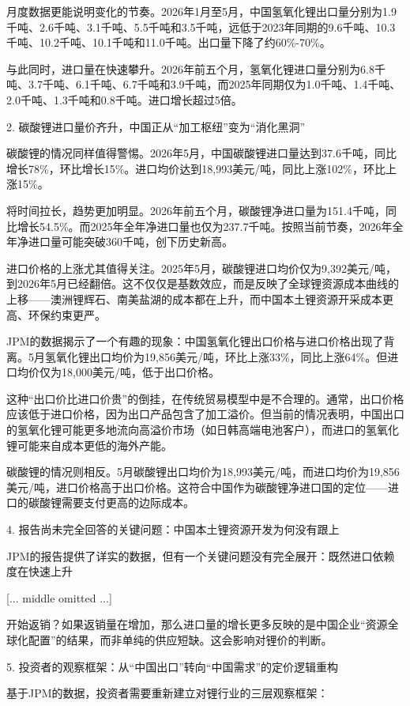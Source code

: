 \documentclass[11pt]{ctexart}
\begin{document}
月度数据更能说明变化的节奏。2026年1月至5月，中国氢氧化锂出口量分别为1.9千吨、2.6千吨、3.1千吨、5.5千吨和3.5千吨，远低于2023年同期的9.6千吨、10.3千吨、10.2千吨、10.1千吨和11.0千吨。出口量下降了约60\%-70\%。

与此同时，进口量在快速攀升。2026年前五个月，氢氧化锂进口量分别为6.8千吨、3.7千吨、6.1千吨、6.7千吨和3.9千吨，而2025年同期仅为1.0千吨、1.4千吨、2.0千吨、1.3千吨和0.8千吨。进口增长超过5倍。

2. 碳酸锂进口量价齐升，中国正从“加工枢纽”变为“消化黑洞”

碳酸锂的情况同样值得警惕。2026年5月，中国碳酸锂进口量达到37.6千吨，同比增长78\%，环比增长15\%。进口均价达到18,993美元/吨，同比上涨102\%，环比上涨15\%。

将时间拉长，趋势更加明显。2026年前五个月，碳酸锂净进口量为151.4千吨，同比增长54.5\%。而2025年全年净进口量也仅为237.7千吨。按照当前节奏，2026年全年净进口量可能突破360千吨，创下历史新高。

进口价格的上涨尤其值得关注。2025年5月，碳酸锂进口均价仅为9,392美元/吨，到2026年5月已经翻倍。这不仅仅是基数效应，而是反映了全球锂资源成本曲线的上移——澳洲锂辉石、南美盐湖的成本都在上升，而中国本土锂资源开采成本更高、环保约束更严。

JPM的数据揭示了一个有趣的现象：中国氢氧化锂出口价格与进口价格出现了背离。5月氢氧化锂出口均价为19,856美元/吨，环比上涨33\%，同比上涨64\%。但进口均价仅为18,000美元/吨，低于出口价格。

这种“出口价比进口价贵”的倒挂，在传统贸易模型中是不合理的。通常，出口价格应该低于进口价格，因为出口产品包含了加工溢价。但当前的情况表明，中国出口的氢氧化锂可能更多地流向高溢价市场（如日韩高端电池客户），而进口的氢氧化锂可能来自成本更低的海外产能。

碳酸锂的情况则相反。5月碳酸锂出口均价为18,993美元/吨，而进口均价为19,856美元/吨，进口价格高于出口价格。这符合中国作为碳酸锂净进口国的定位——进口的碳酸锂需要支付更高的边际成本。

4. 报告尚未完全回答的关键问题：中国本土锂资源开发为何没有跟上

JPM的报告提供了详实的数据，但有一个关键问题没有完全展开：既然进口依赖度在快速上升

[... middle omitted ...]

开始返销？如果返销量在增加，那么进口量的增长更多反映的是中国企业“资源全球化配置”的结果，而非单纯的供应短缺。这会影响对锂价的判断。

5. 投资者的观察框架：从“中国出口”转向“中国需求”的定价逻辑重构

基于JPM的数据，投资者需要重新建立对锂行业的三层观察框架：
\end{document}
